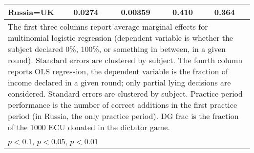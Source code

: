 \begin{tabular}{l|cccccc|cc}
Russia=UK       &   0.0274         &         &  0.00359         &         &    0.410         &         &    0.364         &         \\
\hline\hline
\multicolumn{9}{p{16cm}}{\tiny The first three columns report average marginal effects for multinomial logistic regression (dependent variable is whether the subject declared 0\%,  100\%, or something in between, in a given round). Standard errors are clustered by subject. The fourth column reports OLS regression, the dependent variable is the fraction of income declared in a given round; only partial lying decisions are considered. Standard errors are clustered by subject. Practice period performance is the number of correct additions in the first practice period (in Russia, the only practice period). DG frac is the fraction of the 1000 ECU donated in the dictator game.}\\
\multicolumn{9}{l}{\tiny \sym{*} \(p<0.1\), \sym{**} \(p<0.05\), \sym{***} \(p<0.01\)}\\
\end{tabular}
